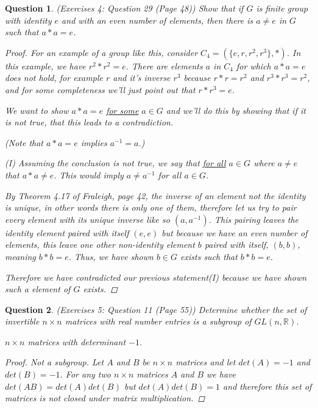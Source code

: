 \documentclass{article}
\newcommand*{\field}[1]{\mathbb{#1}}%
\newtheorem{ques}{Question}
\begin{document}
\begin{ques} (Exercises 4: Question 29 (Page 48))
	Show that if $G$ is finite group with identity $e$ and with an even number of elements, then there is $a \ne e$ in $G$ such that $a * a = e$.
	\begin{proof}
		For an example of a group like this, consider $C_4=(\{e,r, r^2, r^3\}, *)$.  In this example, we have $r^2 * r^2 = e$.  There are elements $a$ in $C_4$ for which $a*a =e$ does not hold, for example $r$ and it's inverse $r^3$ because $r*r=r^2$ and $r^3*r^3=r^2$, and for some completeness we'll just point out that $r*r^3=e$.
		
		We want to show $a * a =  e$ \underline{for some} $a \in G$ and we'll do this by showing that if it is not true, that this leads to a contradiction.
		
		(Note that $a*a=e$ implies $a^{-1} = a$.)
		
		(I) Assuming the conclusion is not true, we say that \underline{for all} $a \in G$ where $a \ne e$ that $a * a \ne e$. This would imply $a \ne a^{-1}$ for all $a \in G$.
		
		By Theorem 4.17 of Fraleigh, page 42, the inverse of an element not the identity is unique, in other words there is only one of them, therefore let us try to pair every element with its unique inverse like so $(a, a^{-1})$.  This pairing leaves the identity element paired with itself $(e,e)$ but because we have an even number of elements, this leave one other non-identity element $b$ paired with itself, $(b,b)$, meaning $b * b = e$.  Thus, we have shown $b \in G$ exists such that $b * b = e$.
		
		Therefore we have contradicted our previous statement(I) because we have shown such a element of $G$ exists.
		\end{proof}
\end{ques}

\begin{ques} (Exercises 5: Question 11 (Page 55))
	Determine whether the set of invertible $n \times n$ matrices with real number entries is a subgroup of $GL(n, \field{R})$.
	
	$n \times n $ matrices with determinant $-1$.
	\begin{proof}
		Not a subgroup.  Let $A$ and $B$ be  $n \times n$ matrices and let $det(A)=-1$ and $det(B)=-1$.  For any two $n \times n$ matrices $A$ and $B$ we have $det(AB) = det(A)det(B)$ but $det(A)det(B) = 1$ and therefore this set of matrices is not closed under matrix multiplication.
	\end{proof}
\end{ques}
\end{document}
